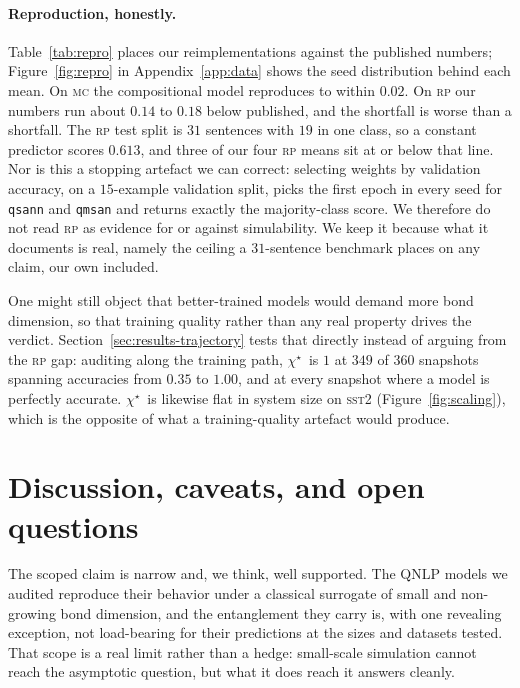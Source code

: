 \documentclass[10pt]{article}
\newcommand{\chistar}{\ensuremath{\chi^\star}}
\begin{document}
\begin{table}[t]
\centering\small

\caption{Reproduction gap: our audited accuracy against the published number, on the
datasets with a published value. \textsc{mc\_real} reproduces to within $0.02$, whereas \textsc{rp}
runs below published, being a fragile task of only $74$ training items reimplemented with our own
embeddings and, for DisCoCat, an offline reader. The simulability verdict concerns our own trained
circuits and is independent of this gap.}
\label{tab:repro}
\end{table}

\paragraph{Reproduction, honestly.} Table~\ref{tab:repro} places our reimplementations against
the published numbers; Figure~\ref{fig:repro} in Appendix~\ref{app:data} shows the seed
distribution behind each mean. On \textsc{mc} the compositional model reproduces to within $0.02$.
On \textsc{rp} our numbers run about $0.14$ to $0.18$ below published, and the shortfall is worse
than a shortfall. The \textsc{rp} test split is $31$ sentences with $19$ in one class, so a constant
predictor scores $0.613$, and three of our four \textsc{rp} means sit at or below that line. Nor is
this a stopping artefact we can correct: selecting weights by validation accuracy, on a $15$-example
validation split, picks the first epoch in every seed for \texttt{qsann} and \texttt{qmsan} and
returns exactly the majority-class score. We therefore do not read \textsc{rp} as evidence for or
against simulability. We keep it because what it documents is real, namely the ceiling a
$31$-sentence benchmark places on any claim, our own included.

One might still object that better-trained models would demand more bond dimension, so that
training quality rather than any real property drives the verdict. Section~\ref{sec:results-trajectory}
tests that directly instead of arguing from the \textsc{rp} gap: auditing along the training path,
\chistar\ is $1$ at $349$ of $360$ snapshots spanning accuracies from $0.35$ to $1.00$, and at every
snapshot where a model is perfectly accurate. \chistar\ is likewise flat in system size on
\textsc{sst2} (Figure~\ref{fig:scaling}), which is the opposite of what a training-quality artefact
would produce.


\section{Discussion, caveats, and open questions}
\label{sec:discussion}
The scoped claim is narrow and, we think, well supported. The QNLP models we audited reproduce their
behavior under a classical surrogate of small and non-growing bond dimension, and the entanglement
they carry is, with one revealing exception, not load-bearing for their predictions at the sizes and
datasets tested. That scope is a real limit rather than a hedge: small-scale simulation cannot reach
the asymptotic question, but what it does reach it answers cleanly.
\end{document}
